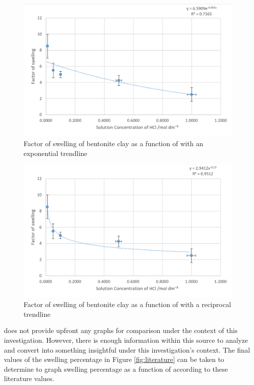 \documentclass[11pt, letterpaper]{article}
\begin{document}
\begin{multicols}{2}
    \begin{figure}[H]
        \centering
        \includegraphics[width=\linewidth]{exponential.png}
        \caption{Factor of swelling of bentonite clay as a function of \ce{[HCl]} with an exponential trendline}
        \label{fig:exponential}
    \end{figure}
    \begin{figure}[H]
        \centering
        \includegraphics[width=0.9\linewidth]{reciprocal.png}
        \caption{Factor of swelling of bentonite clay as a function of \ce{[HCl]} with a reciprocal trendline}
        \label{fig:reciprocal}
    \end{figure}
\end{multicols}

\cite{ramavaraprasadSwellingCharacteristicsSoils2018a}
does not provide upfront any graphs for comparison under
the context of this investigation. However, there is enough
information within this source to analyze and convert
into something insightful under this investigation's context.
The final values of the swelling percentage in Figure \ref*{fig:literature} can
be taken to determine to graph swelling percentage as
a function of \ce{[H_3O+]} according to these literature
values.
\end{document}
